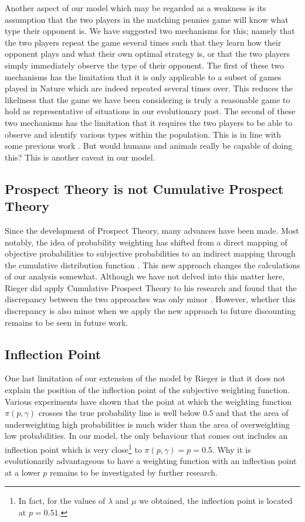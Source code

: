 \documentclass[a4paper,10pt]{article}
\numberwithin{equation}{section}
\begin{document}
Another aspect of our model which may be regarded as a weakness is its assumption that the two players in the matching pennies game will know what type their opponent is. We have suggested two mechanisms for this; namely that the two players repeat the game several times such that they learn how their opponent plays and what their own optimal strategy is, or that the two players simply immediately observe the type of their opponent. The first of these two mechanisms has the limitation that it is only applicable to a subset of games played in Nature which are indeed repeated several times over. This reduces the likeliness that the game we have been considering is truly a reasonable game to hold as representative of situations in our evolutionary past. The second of these two mechanisms has the limitation that it requires the two players to be able to observe and identify various types within the population. This is in line with some previous work \cite{Guth1992, Guth1995}. But would humans and animals really be capable of doing this? This is another caveat in our model.


\subsection{Prospect Theory is not Cumulative Prospect Theory}
\label{sec:Multiple Self}

Since the development of Prospect Theory, many advances have been made. Most notably, the idea of probability weighting has shifted from a direct mapping of objective probabilities to subjective probabilities to an indirect mapping through the cumulative distribution function \cite{Tversky1992}. This new approach changes the calculations of our analysis somewhat. Although we have not delved into this matter here, Rieger did apply Cumulative Prospect Theory to his research and found that the discrepancy between the two approaches was only minor \cite{Rieger2009}. However, whether this discrepancy is also minor when we apply the new approach to future discounting remains to be seen in future work.


\subsection{Inflection Point}
\label{sec:Inflection Point}

One last limitation of our extension of the model by Rieger is that it does not explain the position of the inflection point of the subjective weighting function. Various experiments have shown that the point at which the weighting function $\pi(p, \gamma)$ crosses the true probability line is well below $0.5$ and that the area of underweighting high probabilities is much wider than the area of overweighting low probabilities. In our model, the only behaviour that comes out includes an inflection point which is very close\footnote{In fact, for the values of $\lambda$ and $\mu$ we obtained, the inflection point is located at $p=0.51$.} to $\pi(p, \gamma)=p=0.5$. Why it is evolutionarily advantageous to have a weighting function with an inflection point at a lower $p$ remains to be investigated by further research.\\
\end{document}
